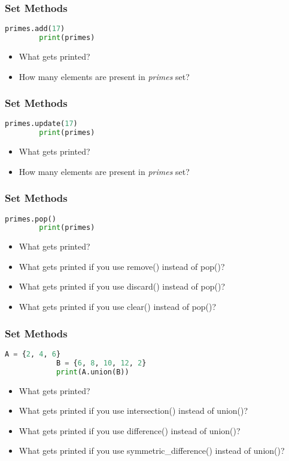 \documentclass[14pt]{beamer}
\begin{document}
    \begin{frame}[containsverbatim]
	\frametitle{Set Methods}
	\begin{lstlisting}[language=python]
	    primes.add(17)
	    print(primes)
	\end{lstlisting}
	\begin{itemize}
	   \item What gets printed?
	   \item How many elements are present in \emph{primes} set?
	\end{itemize}
    \end{frame}
    \begin{frame}[containsverbatim]
        \frametitle{Set Methods}
	\begin{lstlisting}[language=python]
	    primes.update(17)
 	    print(primes)
	\end{lstlisting}
	\begin{itemize}
	   \item What gets printed?
	   \item How many elements are present in \emph{primes} set?
	\end{itemize}
    \end{frame}
    \begin{frame}[containsverbatim]
	\frametitle{Set Methods}
	\begin{lstlisting}[language=python]
	    primes.pop()
	    print(primes)
	\end{lstlisting}
	\begin{itemize}
	   \item What gets printed?
	   \item What gets printed if you use remove() instead of pop()?
	   \item What gets printed if you use discard() instead of pop()?
	   \item What gets printed if you use clear() instead of pop()?
	\end{itemize}
    \end{frame}
    \begin{frame}[containsverbatim]
	\frametitle{Set Methods}
	\begin{lstlisting}[language=python]
	    A = {2, 4, 6}
            B = {6, 8, 10, 12, 2}
            print(A.union(B))
	\end{lstlisting}
	\begin{itemize}
	    \item What gets printed?
	    \item What gets printed if you use intersection() instead of union()?
	    \item What gets printed if you use difference() instead of union()?
	    \item What gets printed if you use symmetric\_difference() instead of union()?
	\end{itemize}
    \end{frame}
\end{document}
